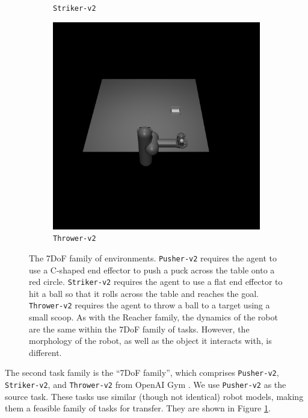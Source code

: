 \begin{figure}[h]
\begin{subfigure}[t]{0.3\textwidth}
    \caption{\texttt{Striker-v2}}
\end{subfigure}
\begin{subfigure}[t]{0.3\textwidth}
    \includegraphics[width=\textwidth]{figures/dyne/Thrower.png}
    \caption{\texttt{Thrower-v2}}
\end{subfigure}

\caption{The 7DoF family of environments. \texttt{Pusher-v2} requires the agent to use a C-shaped end effector to push a puck across the table onto a red circle. \texttt{Striker-v2} requires the agent to use a flat end effector to hit a ball so that it rolls across the table and reaches the goal. \texttt{Thrower-v2} requires the agent to throw a ball to a target using a small scoop.  As with the Reacher family, the dynamics of the robot are the same within the 7DoF family of tasks. However, the morphology of the robot, as well as the object it interacts with, is different.}
\label{fig:7dof_family}
\end{figure}

The second task family is the ``7DoF family'', which comprises \texttt{Pusher-v2}, \texttt{Striker-v2}, and  \texttt{Thrower-v2} from OpenAI Gym \citep{brockman2016openai}.
We use \texttt{Pusher-v2} as the source task.
These tasks use similar (though not identical) robot models, making them a feasible family of tasks for transfer.
They are shown in Figure \ref{fig:7dof_family}.

